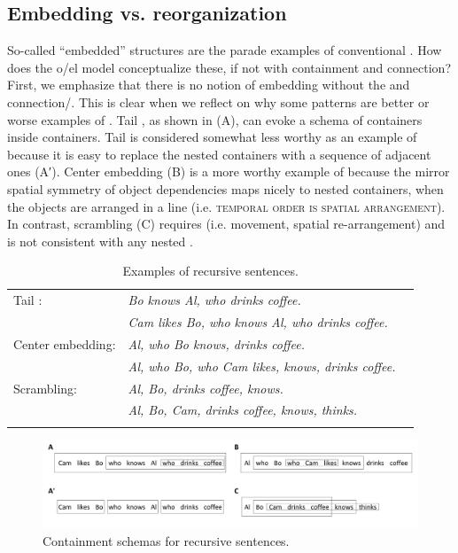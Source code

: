\subsection{Embedding vs. reorganization}

So-called “embedded” structures are the parade examples of conventional . How does the o/el model conceptualize these, if not with containment and connection? First, we emphasize that there is no notion of embedding without the  and connection/. This is clear when we reflect on why some patterns are better or worse examples of . Tail , as shown in {}(A), can evoke a schema of containers inside containers. Tail  is considered somewhat less worthy as an example of  because it is easy to replace the nested containers with a sequence of adjacent ones (A′). Center embedding (B) is a more worthy example of  because the mirror spatial symmetry of object dependencies maps nicely to nested containers, when the objects are arranged in a line (i.e. \textsc{temporal order is spatial arrangement}). In contrast, scrambling (C) requires  (i.e. movement, spatial re-arrangement) and is not consistent with any nested .

\begin{table}
\begin{tabularx}{\textwidth}{lQQ}
\lsptoprule
Tail : & \textit{Bo knows Al, who drinks coffee.} \\
 & \textit{Cam likes Bo, who knows Al, who drinks coffee.}\\
Center embedding: & \textit{Al, who Bo knows, drinks coffee.}\\
 & \textit{Al, who Bo, who Cam likes, knows, drinks coffee.}\\
Scrambling: & \textit{Al, Bo, drinks coffee, knows.}\\
 & \textit{Al, Bo, Cam, drinks coffee, knows, thinks.}\\
\lspbottomrule
\end{tabularx}
\caption{Examples of recursive sentences.}\label{tab:5:3}
\end{table}
  
\begin{figure}
\includegraphics[width=\textwidth]{figures/Tilsen-img118.png}
\caption{Containment schemas for recursive sentences.}
\label{fig:5:14}
\end{figure}
 

